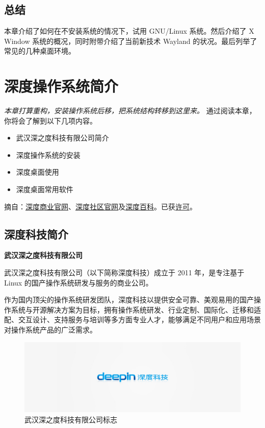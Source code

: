 \documentclass[doctor,openright,twoside]{sjtuthesis}
\providecommand{\tightlist}{%
    \setlength{\itemsep}{0pt}\setlength{\parskip}{0pt}}
\theoremstyle{plain}
\theoremstyle{definition}
\theoremstyle{remark}
\theoremstyle{ocrenumbox}
\theoremstyle{plain}
\begin{document}
\hypertarget{-1}{%
\section{总结}\label{-1}}

本章介绍了如何在不安装系统的情况下，试用 GNU/Linux 系统。然后介绍了 X
Window 系统的概况，同时附带介绍了当前新技术 Wayland
的状况。最后列举了常见的几种桌面环境。

\hypertarget{chap:deepin-intro}{%
\chapter{\texorpdfstring{深度操作系统简介}{深度操作系统简介}}\label{chap:deepin-intro}}

\emph{本章打算重构，安装操作系统后移，把系统结构转移到这里来。}
通过阅读本章，你将会了解到以下几项内容。

\begin{itemize}
\tightlist
\item
  武汉深之度科技有限公司简介
\item
  深度操作系统的安装
\item
  深度桌面使用
\item
  深度桌面常用软件
\end{itemize}

摘自：\href{https://www.deepin.com/}{深度商业官网}、\href{https://www.deepin.org/}{深度社区官网}及\href{http://wiki.deepin.org/wiki/DEEPIN_\%E6\%A1\%8C\%E9\%9D\%A2\%E7\%B3\%BB\%E7\%BB\%9F\%E5\%AE\%89\%E8\%A3\%85\%E6\%A6\%82\%E8\%BF\%B0}{深度百科}。已获\href{https://bbs.deepin.org/forum.php?mod=viewthread\&tid=39632\&page=10\#pid377474}{许可}。

\section{\texorpdfstring{深度科技简介}{深度科技简介}}

\textbf{武汉深之度科技有限公司}

武汉深之度科技有限公司（以下简称深度科技）成立于 2011 年，是专注基于
Linux 的国产操作系统研发与服务的商业公司。

作为国内顶尖的操作系统研发团队，深度科技以提供安全可靠、美观易用的国产操作系统与开源解决方案为目标，拥有操作系统研发、行业定制、国际化、迁移和适配、交互设计、支持服务与培训等多方面专业人才，能够满足不同用户和应用场景对操作系统产品的广泛需求。

\begin{figure}
\includegraphics{about-us_content_logo} \caption[武汉深之度科技有限公司标志]{武汉深之度科技有限公司标志}\label{fig:deepin-inc}
\end{figure}
\end{document}
